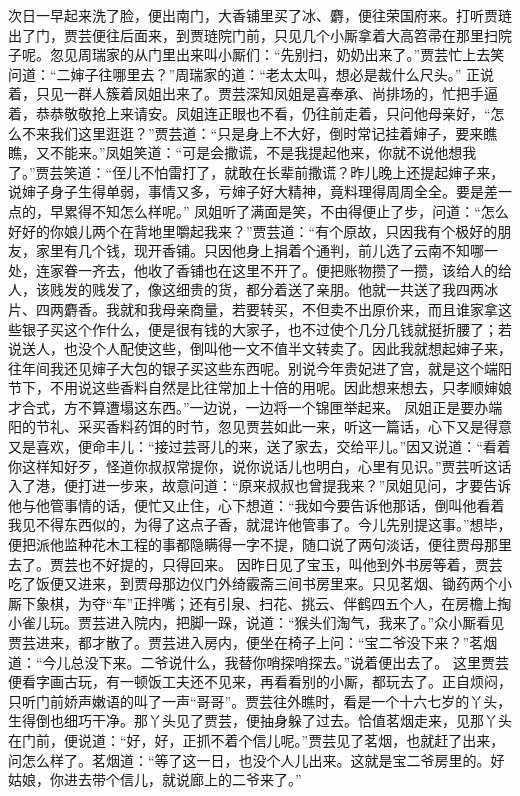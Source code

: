 \documentclass[12pt,oneside]{book}
\begin{document}
次日一早起来洗了脸，便出南门，大香铺里买了冰、麝，便往荣国府来。打听贾琏出了门，贾芸便往后面来，到贾琏院门前，只见几个小厮拿着大高笤帚在那里扫院子呢。忽见周瑞家的从门里出来叫小厮们：“先别扫，奶奶出来了。”贾芸忙上去笑问道：“二婶子往哪里去？”周瑞家的道：“老太太叫，想必是裁什么尺头。”
正说着，只见一群人簇着凤姐出来了。贾芸深知凤姐是喜奉承、尚排场的，忙把手逼着，恭恭敬敬抢上来请安。凤姐连正眼也不看，仍往前走着，只问他母亲好，“怎么不来我们这里逛逛？”贾芸道：“只是身上不大好，倒时常记挂着婶子，要来瞧瞧，又不能来。”凤姐笑道：“可是会撒谎，不是我提起他来，你就不说他想我了。”贾芸笑道：“侄儿不怕雷打了，就敢在长辈前撒谎？昨儿晚上还提起婶子来，说婶子身子生得单弱，事情又多，亏婶子好大精神，竟料理得周周全全。要是差一点的，早累得不知怎么样呢。”
凤姐听了满面是笑，不由得便止了步，问道：“怎么好好的你娘儿两个在背地里嚼起我来？”贾芸道：“有个原故，只因我有个极好的朋友，家里有几个钱，现开香铺。只因他身上捐着个通判，前儿选了云南不知哪一处，连家眷一齐去，他收了香铺也在这里不开了。便把账物攒了一攒，该给人的给人，该贱发的贱发了，像这细贵的货，都分着送了亲朋。他就一共送了我四两冰片、四两麝香。我就和我母亲商量，若要转买，不但卖不出原价来，而且谁家拿这些银子买这个作什么，便是很有钱的大家子，也不过使个几分几钱就挺折腰了；若说送人，也没个人配使这些，倒叫他一文不值半文转卖了。因此我就想起婶子来，往年间我还见婶子大包的银子买这些东西呢。别说今年贵妃进了宫，就是这个端阳节下，不用说这些香料自然是比往常加上十倍的用呢。因此想来想去，只孝顺婶娘才合式，方不算遭塌这东西。”一边说，一边将一个锦匣举起来。
凤姐正是要办端阳的节礼、采买香料药饵的时节，忽见贾芸如此一来，听这一篇话，心下又是得意又是喜欢，便命丰儿：“接过芸哥儿的来，送了家去，交给平儿。”因又说道：“看着你这样知好歹，怪道你叔叔常提你，说你说话儿也明白，心里有见识。”贾芸听这话入了港，便打进一步来，故意问道：“原来叔叔也曾提我来？”凤姐见问，才要告诉他与他管事情的话，便忙又止住，心下想道：“我如今要告诉他那话，倒叫他看着我见不得东西似的，为得了这点子香，就混许他管事了。今儿先别提这事。”想毕，便把派他监种花木工程的事都隐瞒得一字不提，随口说了两句淡话，便往贾母那里去了。贾芸也不好提的，只得回来。
因昨日见了宝玉，叫他到外书房等着，贾芸吃了饭便又进来，到贾母那边仪门外绮霰斋三间书房里来。只见茗烟、锄药两个小厮下象棋，为夺“车”正拌嘴；还有引泉、扫花、挑云、伴鹤四五个人，在房檐上掏小雀儿玩。贾芸进入院内，把脚一跺，说道：“猴头们淘气，我来了。”众小厮看见贾芸进来，都才散了。贾芸进入房内，便坐在椅子上问：“宝二爷没下来？”茗烟道：“今儿总没下来。二爷说什么，我替你哨探哨探去。”说着便出去了。
这里贾芸便看字画古玩，有一顿饭工夫还不见来，再看看别的小厮，都玩去了。正自烦闷，只听门前娇声嫩语的叫了一声“哥哥”。贾芸往外瞧时，看是一个十六七岁的丫头，生得倒也细巧干净。那丫头见了贾芸，便抽身躲了过去。恰值茗烟走来，见那丫头在门前，便说道：“好，好，正抓不着个信儿呢。”贾芸见了茗烟，也就赶了出来，问怎么样了。茗烟道：“等了这一日，也没个人儿出来。这就是宝二爷房里的。好姑娘，你进去带个信儿，就说廊上的二爷来了。”
\end{document}
